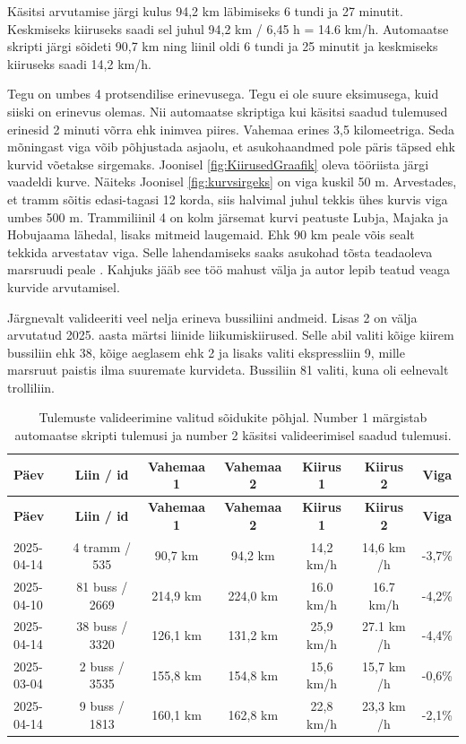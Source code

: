Käsitsi arvutamise järgi kulus 94,2 km läbimiseks 6 tundi ja 27 minutit. Keskmiseks kiiruseks saadi sel juhul 94,2 km / 6,45 h = 14.6 km/h. Automaatse skripti järgi sõideti 90,7 km ning liinil oldi 6 tundi ja 25 minutit ja keskmiseks kiiruseks saadi 14,2 km/h. 

Tegu on umbes 4 protsendilise erinevusega. Tegu ei ole suure eksimusega, kuid siiski on erinevus olemas. Nii automaatse skriptiga kui käsitsi saadud tulemused erinesid 2 minuti võrra ehk inimvea piires. 
Vahemaa erines 3,5 kilomeetriga. Seda mõningast viga võib põhjustada asjaolu, et asukohaandmed pole päris täpsed ehk kurvid võetakse sirgemaks. Joonisel \ref{fig:KiirusedGraafik} oleva tööriista järgi vaadeldi kurve. Näiteks Joonisel \ref{fig:kurvsirgeks} on viga kuskil 50 m. Arvestades, et tramm sõitis edasi-tagasi 12 korda, siis halvimal juhul tekkis ühes kurvis viga umbes 500 m. Trammiliinil 4 on kolm järsemat kurvi peatuste Lubja, Majaka ja Hobujaama lähedal, lisaks mitmeid laugemaid. Ehk 90 km peale võis sealt tekkida arvestatav viga. Selle lahendamiseks saaks asukohad tõsta teadaoleva marsruudi peale \cite{buenosAires}. Kahjuks jääb see töö mahust välja ja autor lepib teatud veaga kurvide arvutamisel.  

Järgnevalt valideeriti veel nelja erineva bussiliini andmeid. Lisas 2 on välja arvutatud 2025. aasta märtsi liinide liikumiskiirused. Selle abil valiti kõige kiirem bussiliin ehk 38, kõige aeglasem ehk 2 ja lisaks valiti ekspressliin 9, mille marsruut paistis ilma suuremate kurvideta. Bussiliin 81 valiti, kuna oli eelnevalt trolliliin.

\begin{longtable}{|l|c|c|c|c|c|c|}
\caption{Tulemuste valideerimine valitud sõidukite põhjal. Number 1 märgistab automaatse skripti tulemusi ja number 2 käsitsi valideerimisel saadud tulemusi. }
\label{tab:valideerimine}\\ \hline %
\textbf{Päev} & \textbf{Liin / id} & \textbf{Vahemaa 1} & \textbf{Vahemaa 2} & \textbf{Kiirus 1} & \textbf{Kiirus 2 } & \textbf{Viga} \\ \hline
\endfirsthead
\hline
\textbf{Päev} & \textbf{Liin / id} & \textbf{Vahemaa 1} & \textbf{Vahemaa 2} & \textbf{Kiirus 1} & \textbf{Kiirus 2 } & \textbf{Viga} \\ \hline
\endhead
2025-04-14 & 4 tramm / 535  & 90,7 km & 94,2 km & 14,2 km/h & 14,6 km /h & -3,7\% \\ \hline
2025-04-10 & 81 buss / 2669  & 214,9 km & 224,0 km & 16.0 km/h & 16.7 km/h & -4,2\% \\ \hline

2025-04-14 & 38 buss / 3320  & 126,1 km & 131,2 km & 25,9 km/h & 27.1 km /h & -4,4\% \\ \hline
2025-03-04 & 2 buss / 3535  & 155,8 km & 154,8 km & 15,6 km/h & 15,7 km /h & -0,6\% \\ \hline
2025-04-14 & 9 buss / 1813  & 160,1 km & 162,8 km & 22,8 km/h & 23,3 km /h & -2,1\% \\ \hline
\end{longtable}

